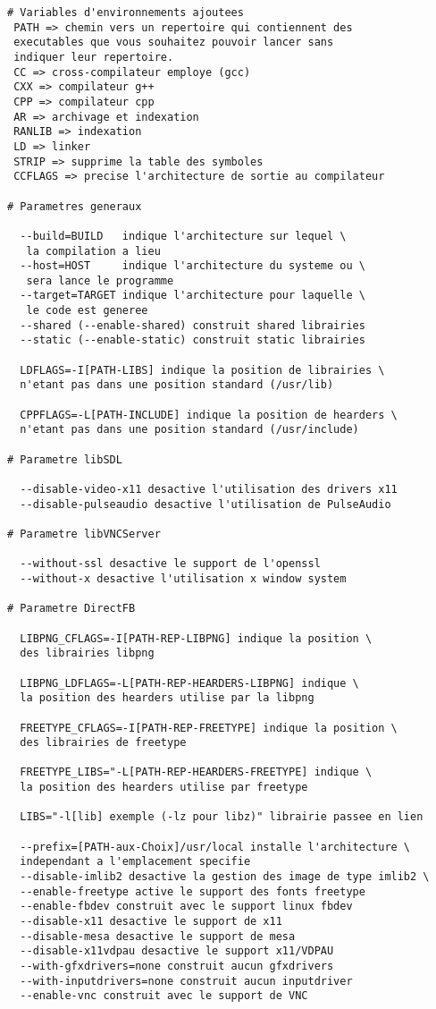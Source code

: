 \begin{lstlisting}
# Variables d'environnements ajoutees
 PATH => chemin vers un repertoire qui contiennent des
 executables que vous souhaitez pouvoir lancer sans
 indiquer leur repertoire.
 CC => cross-compilateur employe (gcc)
 CXX => compilateur g++
 CPP => compilateur cpp
 AR => archivage et indexation
 RANLIB => indexation
 LD => linker
 STRIP => supprime la table des symboles
 CCFLAGS => precise l'architecture de sortie au compilateur

# Parametres generaux
  
  --build=BUILD   indique l'architecture sur lequel \
   la compilation a lieu
  --host=HOST     indique l'architecture du systeme ou \
   sera lance le programme   
  --target=TARGET indique l'architecture pour laquelle \
   le code est generee
  --shared (--enable-shared) construit shared librairies
  --static (--enable-static) construit static librairies
 
  LDFLAGS=-I[PATH-LIBS] indique la position de librairies \ 
  n'etant pas dans une position standard (/usr/lib)
  
  CPPFLAGS=-L[PATH-INCLUDE] indique la position de hearders \ 
  n'etant pas dans une position standard (/usr/include)
  
# Parametre libSDL

  --disable-video-x11 desactive l'utilisation des drivers x11 
  --disable-pulseaudio desactive l'utilisation de PulseAudio
  
# Parametre libVNCServer  

  --without-ssl desactive le support de l'openssl
  --without-x desactive l'utilisation x window system
  
# Parametre DirectFB 

  LIBPNG_CFLAGS=-I[PATH-REP-LIBPNG] indique la position \ 
  des librairies libpng
  
  LIBPNG_LDFLAGS=-L[PATH-REP-HEARDERS-LIBPNG] indique \ 
  la position des hearders utilise par la libpng
  
  FREETYPE_CFLAGS=-I[PATH-REP-FREETYPE] indique la position \ 
  des librairies de freetype
 
  FREETYPE_LIBS="-L[PATH-REP-HEARDERS-FREETYPE] indique \ 
  la position des hearders utilise par freetype
 
  LIBS="-l[lib] exemple (-lz pour libz)" librairie passee en lien
  
  --prefix=[PATH-aux-Choix]/usr/local installe l'architecture \ 
  independant a l'emplacement specifie
  --disable-imlib2 desactive la gestion des image de type imlib2 \
  --enable-freetype active le support des fonts freetype 
  --enable-fbdev construit avec le support linux fbdev
  --disable-x11 desactive le support de x11
  --disable-mesa desactive le support de mesa
  --disable-x11vdpau desactive le support x11/VDPAU
  --with-gfxdrivers=none construit aucun gfxdrivers
  --with-inputdrivers=none construit aucun inputdriver
  --enable-vnc construit avec le support de VNC
  
\end{lstlisting}

